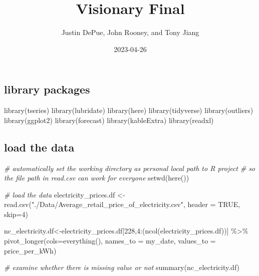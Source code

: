 \documentclass[
]{article}
\title{Visionary Final}
\author{Justin DePue, John Rooney, and Tony Jiang}
\date{2023-04-26}
\newenvironment{Shaded}{\begin{snugshade}}{\end{snugshade}}
\newcommand{\AttributeTok}[1]{\textcolor[rgb]{0.77,0.63,0.00}{#1}}
\newcommand{\CommentTok}[1]{\textcolor[rgb]{0.56,0.35,0.01}{\textit{#1}}}
\newcommand{\ConstantTok}[1]{\textcolor[rgb]{0.00,0.00,0.00}{#1}}
\newcommand{\DecValTok}[1]{\textcolor[rgb]{0.00,0.00,0.81}{#1}}
\newcommand{\FunctionTok}[1]{\textcolor[rgb]{0.00,0.00,0.00}{#1}}
\newcommand{\NormalTok}[1]{#1}
\newcommand{\OtherTok}[1]{\textcolor[rgb]{0.56,0.35,0.01}{#1}}
\newcommand{\SpecialCharTok}[1]{\textcolor[rgb]{0.00,0.00,0.00}{#1}}
\newcommand{\StringTok}[1]{\textcolor[rgb]{0.31,0.60,0.02}{#1}}
\begin{document}
\maketitle

\hypertarget{library-packages}{%
\subsection{library packages}\label{library-packages}}

\begin{Shaded}
\begin{Highlighting}[]
\FunctionTok{library}\NormalTok{(tseries)}
\FunctionTok{library}\NormalTok{(lubridate)}
\FunctionTok{library}\NormalTok{(here)}
\FunctionTok{library}\NormalTok{(tidyverse)}
\FunctionTok{library}\NormalTok{(outliers)}
\FunctionTok{library}\NormalTok{(ggplot2)}
\FunctionTok{library}\NormalTok{(forecast)}
\FunctionTok{library}\NormalTok{(kableExtra)}
\FunctionTok{library}\NormalTok{(readxl)}
\end{Highlighting}
\end{Shaded}

\hypertarget{load-the-data}{%
\subsection{load the data}\label{load-the-data}}

\begin{Shaded}
\begin{Highlighting}[]
\CommentTok{\# automatically set the working directory as personal local path to R project}
\CommentTok{\# so the file path in read.csv can work for everyone}
\FunctionTok{setwd}\NormalTok{(}\FunctionTok{here}\NormalTok{())}

\CommentTok{\# load the data}
\NormalTok{electricity\_prices.df }\OtherTok{\textless{}{-}} \FunctionTok{read.csv}\NormalTok{(}\StringTok{"./Data/Average\_retail\_price\_of\_electricity.csv"}\NormalTok{, }\AttributeTok{header =} \ConstantTok{TRUE}\NormalTok{, }\AttributeTok{skip=}\DecValTok{4}\NormalTok{)}

\NormalTok{nc\_electricity.df}\OtherTok{\textless{}{-}}\NormalTok{electricity\_prices.df[}\DecValTok{228}\NormalTok{,}\DecValTok{4}\SpecialCharTok{:}\NormalTok{(}\FunctionTok{ncol}\NormalTok{(electricity\_prices.df))] }\SpecialCharTok{\%\textgreater{}\%}
  \FunctionTok{pivot\_longer}\NormalTok{(}\AttributeTok{cols=}\FunctionTok{everything}\NormalTok{(), }\AttributeTok{names\_to =} \StringTok{\textquotesingle{}my\_date\textquotesingle{}}\NormalTok{, }\AttributeTok{values\_to =} \StringTok{\textquotesingle{}price\_per\_kWh\textquotesingle{}}\NormalTok{)}

\CommentTok{\# examine whether there is missing value or not}
\FunctionTok{summary}\NormalTok{(nc\_electricity.df)}
\end{Highlighting}
\end{Shaded}
\end{document}
